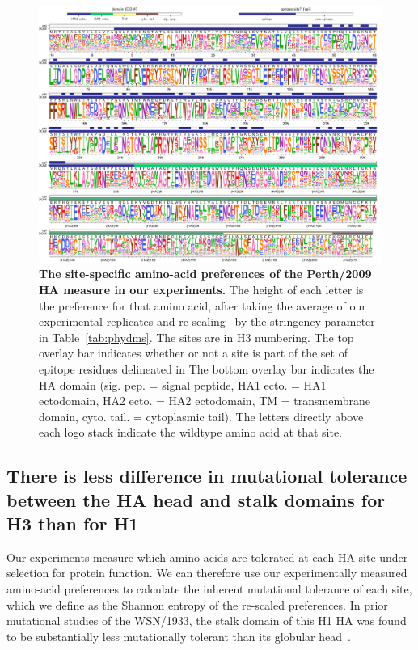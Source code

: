 \documentclass[9pt,twocolumn,twoside]{pnas-new}
\begin{document}
\begin{figure}
\centering
\includegraphics[width=17cm]{figs/prefslogoplot/rescaled-avgprefs_prefs.pdf}
\caption{\label{fig:logoplot}
{\bf The site-specific amino-acid preferences of the Perth/2009 HA measure in our experiments.}
The height of each letter is the preference for that amino acid, after taking the average of our experimental replicates and re-scaling~\cite{hilton2017phydms} by the stringency parameter in Table~\ref{tab:phydms}.
The sites are in H3 numbering.
The top overlay bar indicates whether or not a site is part of the set of epitope residues delineated in \cite{wolf2006long}
The bottom overlay bar indicates the HA domain (sig. pep. = signal peptide, HA1 ecto. = HA1 ectodomain, HA2 ecto. = HA2 ectodomain, TM = transmembrane domain, cyto. tail. = cytoplasmic tail).
The letters directly above each logo stack indicate the wildtype amino acid at that site.
}
\end{figure}

\subsection*{There is less difference in mutational tolerance between the HA head and stalk domains for H3 than for H1}
Our experiments measure which amino acids are tolerated at each HA site under selection for protein function.
We can therefore use our experimentally measured amino-acid preferences to calculate the inherent mutational tolerance of each site, which we define as the Shannon entropy of the re-scaled preferences.
In prior mutational studies of the WSN/1933, the stalk domain of this H1 HA was found to be substantially less mutationally tolerant than its globular head~\cite{thyagarajan2014inherent,doud2016accurate}.
\end{document}
